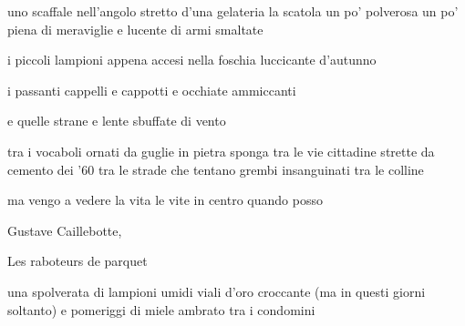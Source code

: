 \begin{poem}
	\begin{stanza}
		uno scaffale nell'angolo\verseline
		stretto d'una gelateria\verseline
		la scatola un po' polverosa\verseline
		un po' piena di meraviglie\verseline
		e lucente di armi smaltate
	\end{stanza}

	\begin{stanza}
		i piccoli lampioni appena accesi\verseline
		nella foschia luccicante d'autunno
	\end{stanza}

	\begin{stanza}
		i passanti\verseline
		cappelli e cappotti\verseline
		e occhiate ammiccanti
	\end{stanza}

	\begin{stanza}
		e quelle strane e lente sbuffate di vento
	\end{stanza}

	\begin{stanza}
		tra i vocaboli ornati da guglie in pietra sponga\verseline
		tra le vie cittadine strette da cemento dei '60\verseline
		tra le strade che tentano grembi insanguinati tra le colline
	\end{stanza}

	\begin{stanza}
		ma vengo a vedere\verseline
		la vita\verseline
		le vite\verseline
		in centro\verseline
		quando posso
	\end{stanza}
\end{poem}

\clearpage


\begin{artItem}
	Gustave Caillebotte, \begin{otherlanguage}{french}%
		Les raboteurs de parquet%
	\end{otherlanguage}
\end{artItem}

\begin{poem}
	\begin{stanza}
		una spolverata di lampioni umidi\verseline
		viali d'oro croccante\verseline
		(ma in questi giorni soltanto)\verseline
		e pomeriggi di miele ambrato\verseline
		tra i condomini
	\end{stanza}
\end{poem}

\clearpage

